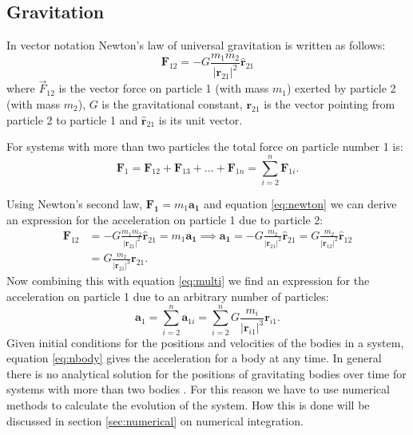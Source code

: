 \documentclass[a4paper]{article}
\newcommand{\vect}[1]{\boldsymbol{#1}}
\begin{document}
\subsection{Gravitation}
In vector notation Newton's law of universal gravitation is written as follows:
\begin{equation} \label{eq:newton}
  \vect{F}_{12}=-G\frac{m_{1}m_{2}}{|\vect{r}_{21}|^{2}}\hat{\vect{r}}_{21}
\end{equation}
where $\vec{F}_{12}$ is the vector force on particle 1 (with mass $m_{1}$) exerted by particle 2
(with mass $m_{2}$), $G$ is the gravitational constant, $\vect{r}_{21}$ is the vector pointing from
particle 2 to particle 1 and $\hat{\vect{r}}_{21}$ is its unit vector. \cite{giancoli}

For systems with more than two particles the total force on particle number 1 is:
\begin{equation} \label{eq:multi}
\vect{F}_{1}=\vect{F}_{12} + \vect{F}_{13} + ... + \vect{F}_{1n} = \sum_{i=2}^{n} \vect{F}_{1i}.
\end{equation}

Using Newton's second law, $\vect{F_{1}}=m_{1} \vect{a_{1}}$ and equation \ref{eq:newton} we can
derive an expression for the acceleration on particle 1 due to particle 2:
\begin{align} \label{eq:newton2}
  \vect{F}_{12} &=-G\frac{m_{1}m_{2}}{|\vect{r}_{21}|^{2}}\hat{\vect{r}}_{21} = m_{1} \vect{a_{1}}
  \implies \vect{a_{1}} = -G\frac{m_{2}}{|\vect{r}_{21}|^{2}}\hat{\vect{r}}_{21}
  = G\frac{m_{2}}{|\vect{r}_{12}|^{2}}\hat{\vect{r}}_{12} \nonumber \\[+3mm]
  &= G\frac{m_{2}}{|\vect{r}_{21}|^{3}}\vect{r}_{21}.
\end{align}
Now combining this with equation \ref{eq:multi} we find an expression for the acceleration on
particle 1 due to an arbitrary number of particles:
\begin{equation} \label{eq:nbody}
\vect{a}_{1} = \sum_{i=2}^{n} \vect{a}_{1i} = \sum_{i=2}^{n} G\frac{m_{i}}{|\vect{r}_{i1}|^{3}}\vect{r}_{i1}.
\end{equation}
Given initial conditions for the positions and velocities of the bodies in a system, equation
\ref{eq:nbody} gives the acceleration for a body at any time. In general there is no analytical
solution for the positions of gravitating bodies over time for systems with more than two bodies
\cite{scholar:nbody}. For this reason we have to use numerical methods to calculate the evolution of
the system. How this is done will be discussed in section \ref{sec:numerical} on numerical
integration.
\end{document}

